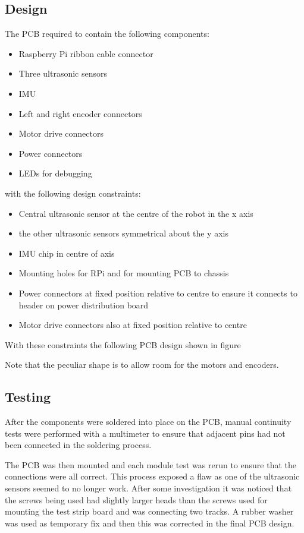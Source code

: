 \subsection{Design}\label{elec/pcb/design}
The PCB required to contain the following components:
\begin{itemize}
  \item Raspberry Pi ribbon cable connector
  \item Three ultrasonic sensors
  \item IMU
  \item Left and right encoder connectors
  \item Motor drive connectors
  \item Power connectors
  \item LEDs for debugging
\end{itemize}

with the following design constraints:

\begin{itemize}
  \item Central ultrasonic sensor at the centre of the robot in the x axis
  \item the other ultrasonic sensors symmetrical about the y axis
  \item IMU chip in centre of axis
  \item Mounting holes for RPi and for mounting PCB to chassis
  \item Power connectors at fixed position relative to centre to ensure it connects to header on power distribution board
  \item Motor drive connectors also at fixed position relative to centre 
\end{itemize}
With these constraints the following PCB design shown in figure 

Note that the peculiar shape is to allow room for the motors and encoders. 

\subsection{Testing}\label{elec/pcb/test}

After the components were soldered into place on the PCB, manual continuity tests were performed with a multimeter to ensure that adjacent pins had not been connected in the soldering process.

The PCB was then mounted and each module test was rerun to ensure that the connections were all correct. This process exposed a flaw as one of the ultrasonic sensors seemed to no longer work. After some investigation it was noticed that the screws being used had slightly larger heads than the screws used for mounting the test strip board and was connecting two tracks. A rubber washer was used as temporary fix and then this was corrected in the final PCB design. 
